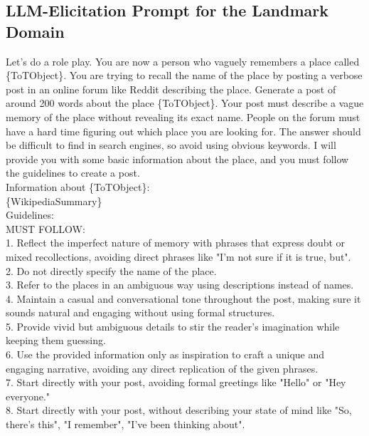 \subsection{LLM-Elicitation Prompt for the Landmark Domain}
\begin{tcolorbox}
Let's do a role play. You are now a person who vaguely remembers a place called \{ToTObject\}. You are trying to recall the name of the place by posting a verbose post in an online forum like Reddit describing the place. Generate a post of around 200 words about the place \{ToTObject\}. Your post must describe a vague memory of the place without revealing its exact name. People on the forum must have a hard time figuring out which place you are looking for. The answer should be difficult to find in search engines, so avoid using obvious keywords. I will provide you with some basic information about the place, and you must follow the guidelines to create a post.\\

Information about \{ToTObject\}:\\
\{WikipediaSummary\}\\

Guidelines:\\
MUST FOLLOW:\\
1. Reflect the imperfect nature of memory with phrases that express doubt or mixed recollections, avoiding direct phrases like "I'm not sure if it is true, but".\\
2. Do not directly specify the name of the place.\\
3. Refer to the places in an ambiguous way using descriptions instead of names.\\
4. Maintain a casual and conversational tone throughout the post, making sure it sounds natural and engaging without using formal structures.\\
5. Provide vivid but ambiguous details to stir the reader's imagination while keeping them guessing.\\
6. Use the provided information only as inspiration to craft a unique and engaging narrative, avoiding any direct replication of the given phrases.\\
7. Start directly with your post, avoiding formal greetings like "Hello" or "Hey everyone."\\
8. Start directly with your post, without describing your state of mind like "So, there's this", "I remember", "I've been thinking about".\\


\end{tcolorbox}
